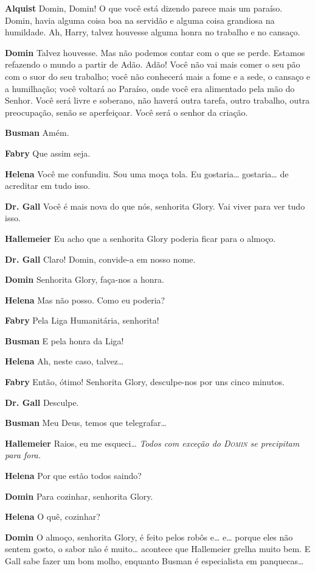 \textbf{Alquist} Domin, Domin! O que você está dizendo parece mais um paraíso. Domin,
havia alguma coisa boa na servidão e alguma coisa grandiosa na humildade. Ah,
Harry, talvez houvesse alguma honra no trabalho e no cansaço.

\textbf{Domin} Talvez houvesse. Mas não podemos contar com o que se perde. Estamos
refazendo o mundo a partir de Adão. Adão! Você não vai mais comer o seu
pão com o suor do seu trabalho; você não conhecerá mais a fome e a sede, o
cansaço e a humilhação; você voltará ao Paraíso, onde você era alimentado pela
mão do Senhor. Você será livre e soberano, não haverá outra tarefa, outro
trabalho, outra preocupação, senão se aperfeiçoar. Você será o senhor da criação.

\textbf{Busman} Amém.

\textbf{Fabry} Que assim seja.

\textbf{Helena} Você me confundiu. Sou uma moça tola. Eu gostaria\ldots{} gostaria\ldots{} de
acreditar em tudo isso.

\textbf{Dr. Gall} Você é mais nova do que nós, senhorita Glory. Vai viver para ver tudo
isso.

\textbf{Hallemeier} Eu acho que a senhorita Glory poderia ficar para o almoço.

\textbf{Dr. Gall} Claro! Domin, convide-a em nosso nome.

\textbf{Domin} Senhorita Glory, faça-nos a honra.

\textbf{Helena} Mas não posso. Como eu poderia?

\textbf{Fabry} Pela Liga Humanitária, senhorita!

\textbf{Busman} E pela honra da Liga!

\textbf{Helena} Ah, neste caso, talvez\ldots{}

\textbf{Fabry} Então, ótimo! Senhorita Glory, desculpe-nos por uns cinco minutos.

\textbf{Dr. Gall} Desculpe.

\textbf{Busman} Meu Deus, temos que telegrafar\ldots{}

\textbf{Hallemeier} Raios, eu me esqueci\ldots{}
\emph{Todos com exceção do \textsc{Domin} se precipitam para fora.}

\textbf{Helena} Por que estão todos saindo?

\textbf{Domin} Para cozinhar, senhorita Glory.

\textbf{Helena} O quê, cozinhar?

\textbf{Domin} O almoço, senhorita Glory, é feito pelos robôs e\ldots{} e\ldots{} porque
eles não sentem gosto, o sabor não é muito\ldots{} acontece que Hallemeier grelha
muito bem. E Gall sabe fazer um bom molho, enquanto Busman é especialista em
panquecas\ldots{}

